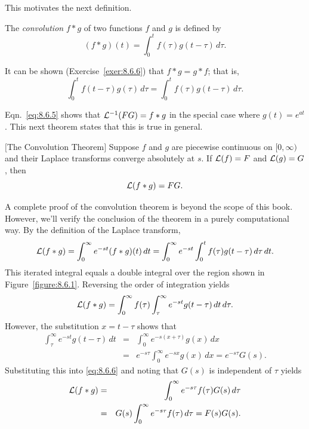 This motivates the next definition.

\begin{definition}
  \color{blue}
  \label{thmtype:8.6.1} \rm The {\color{blue}\it convolution\/} $f*g$ of two functions $f$ and $g$
  is defined by
  \[
    (f*g)(t)=\int_{0}^{t}f(\tau)g(t-\tau)\,d\tau.
  \]
\end{definition}

It can be shown (Exercise~\ref{exer:8.6.6}) that $f\ast g=g\ast f$; that is,
\[
  \int_{0}^{t}f(t-\tau)g(\tau)\,d\tau=\int_{0}^{t}f(\tau)g(t-\tau)\,d\tau.
\]

Eqn.~\eqref{eq:8.6.5} shows that ${\cal L}^{-1}(FG)=f*g$ in the special case where $g(t)=e^{at}$.
This next theorem states that this is true in general.

\begin{theorem}
  \color{blue}
  $[$The Convolution Theorem$]$\label{thmtype:8.6.2} Suppose $f$ and $g$ are piecewise continuous on $[0,\infty)$ and their Laplace transforms converge absolutely at $s$. If ${\cal L}(f)=F$ and ${\cal L}(g)=G$, then
  \[
    {\cal L}(f*g)=FG.
  \]
\end{theorem}

A complete proof of the convolution theorem is beyond the scope of this book. However, we'll verify the conclusion of the theorem in a purely
computational way. By the definition of the Laplace transform,
\[
  {\cal L}(f\ast g)=\int_{0}^{\infty}e^{-st}(f\ast g)(t)\,dt=\int_{0}^{\infty}e^{-st}\int_{0}^{t}f(\tau)g(t-\tau)\,d\tau\,dt.
\]
This iterated integral equals a double integral over the region shown in Figure~\ref{figure:8.6.1}.
Reversing the order of integration yields
\begin{equation}
  \label{eq:8.6.6}{\cal L}(f*g)=\int_{0}^{\infty}f(\tau)\int^{\infty}_{\tau}e^{-st}g(t-\tau)\, dt \,d\tau.
\end{equation}
However, the substitution $x=t-\tau$ shows that
\begin{eqnarray*}
  \int^{\infty}_{\tau}e^{-st}g(t-\tau)\,dt & = & \int_{0}^{\infty}e^{-s(x+\tau)}g(x)\,dx \\
                                           & = & e^{-s\tau}\int_{0}^{\infty}e^{-sx}g(x)\,dx=e^{-s\tau}G(s).
\end{eqnarray*}
Substituting this into \eqref{eq:8.6.6} and noting that $G(s)$ is independent of $\tau$ yields
\begin{eqnarray*}
  {\cal L}(f\ast g) & = & \int_{0}^{\infty}e^{-s\tau}f(\tau)G(s)\,d\tau \\
                    & = & G(s)\int_{0}^{\infty}e^{-s\tau}f(\tau)\,d\tau=F(s)G(s).
\end{eqnarray*}

